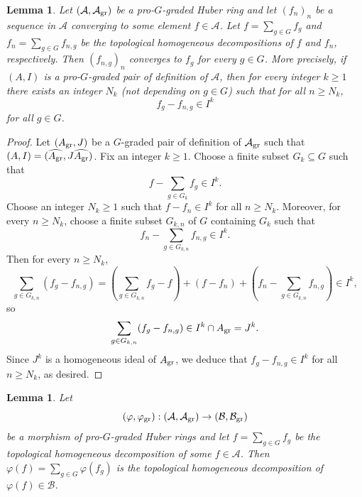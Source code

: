\documentclass[12pt,twoside,a4paper]{article}
\newtheorem{lemma}[thm]{Lemma}
\theoremstyle{definition}
\theoremstyle{remark}
\newcommand\gr{{\rm gr}}
\begin{document}
\begin{lemma}\label{Grading and topology 2}Let $(\mathcal{A}, \mathcal{A}_{\gr})$ be a pro-$G$-graded Huber ring and let $(f_{n})_{n}$ be a sequence in $\mathcal{A}$ converging to some element $f\in \mathcal{A}$. Let $f=\sum_{g\in G}f_{g}$ and $f_{n}=\sum_{g\in G}f_{n, g}$ be the topological homogeneous decompositions of $f$ and $f_{n}$, respectively. Then $(f_{n, g})_{n}$ converges to $f_{g}$ for every $g\in G$. More precisely, if $(A, I)$ is a pro-$G$-graded pair of definition of $\mathcal{A}$, then for every integer $k\geq1$ there exists an integer $N_{k}$ (not depending on $g\in G$) such that for all $n\geq N_{k}$, \begin{equation*}f_{g}-f_{n, g}\in I^{k}\end{equation*}for all $g\in G$.\end{lemma}
\begin{proof}Let $(A_{\gr}, J)$ be a $G$-graded pair of definition of $\mathcal{A}_{\gr}$ such that $(A, I)=(\widehat{A_{\gr}}, J\widehat{A_{\gr}})$. Fix an integer $k\geq1$. Choose a finite subset $G_{k}\subseteq G$ such that \begin{equation*}f-\sum_{g\in G_{k}}f_{g}\in I^{k}.\end{equation*}Choose an integer $N_{k}\geq1$ such that $f-f_{n}\in I^{k}$ for all $n\geq N_{k}$. Moreover, for every $n\geq N_{k}$, choose a finite subset $G_{k, n}$ of $G$ containing $G_{k}$ such that \begin{equation*}f_{n}-\sum_{g\in G_{k, n}}f_{n, g}\in I^{k}.\end{equation*}Then for every $n\geq N_{k}$, \begin{equation*}\sum_{g\in G_{k, n}}(f_{g}-f_{n, g})=(\sum_{g\in G_{k, n}}f_{g}-f)+(f-f_{n})+(f_{n}-\sum_{g\in G_{k, n}}f_{n, g})\in I^{k},\end{equation*}so \begin{equation*}\sum_{g\in G_{k, n}}(f_{g}-f_{n, g})\in I^{k}\cap A_{\gr}=J^{k}.\end{equation*}Since $J^{k}$ is a homogeneous ideal of $A_{\gr}$, we deduce that $f_{g}-f_{n, g}\in I^{k}$ for all $n\geq N_{k}$, as desired. \end{proof}
\begin{lemma}\label{Homogeneous decompositions and morphisms}Let \begin{equation*}(\varphi, \varphi_{\gr}): (\mathcal{A}, \mathcal{A}_{\gr})\to (\mathcal{B}, \mathcal{B}_{\gr})\end{equation*}be a morphism of pro-$G$-graded Huber rings and let $f=\sum_{g\in G}f_{g}$ be the topological homogeneous decomposition of some $f\in\mathcal{A}$. Then $\varphi(f)=\sum_{g\in G}\varphi(f_{g})$ is the topological homogeneous decomposition of $\varphi(f)\in \mathcal{B}$.\end{lemma}
\end{document}
